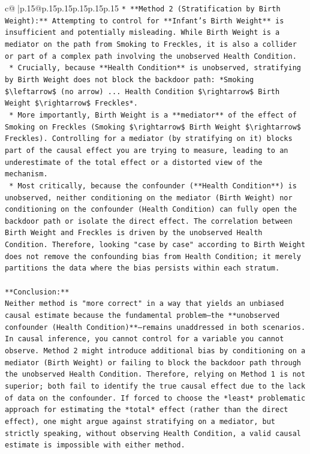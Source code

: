 \documentclass{article}
\begin{document}
{\begin{supertabular}{c@{$\;$}|p{.15\linewidth}@{}p{.15\linewidth}p{.15\linewidth}p{.15\linewidth}p{.15\linewidth}p{.15\linewidth}}
{{{\texttt{*   **Method 2 (Stratification by Birth Weight):** Attempting to control for **Infant's Birth Weight** is insufficient and potentially misleading. While Birth Weight is a mediator on the path from Smoking to Freckles, it is also a collider or part of a complex path involving the unobserved Health Condition.} \\
\texttt{    *   Crucially, because **Health Condition** is unobserved, stratifying by Birth Weight does not block the backdoor path: *Smoking \$\textbackslash{}leftarrow\$ (no arrow) ... Health Condition \$\textbackslash{}rightarrow\$ Birth Weight \$\textbackslash{}rightarrow\$ Freckles*.} \\
\texttt{    *   More importantly, Birth Weight is a **mediator** of the effect of Smoking on Freckles (Smoking \$\textbackslash{}rightarrow\$ Birth Weight \$\textbackslash{}rightarrow\$ Freckles). Controlling for a mediator (by stratifying on it) blocks part of the causal effect you are trying to measure, leading to an underestimate of the total effect or a distorted view of the mechanism.} \\
\texttt{    *   Most critically, because the confounder (**Health Condition**) is unobserved, neither conditioning on the mediator (Birth Weight) nor conditioning on the confounder (Health Condition) can fully open the backdoor path or isolate the direct effect. The correlation between Birth Weight and Freckles is driven by the unobserved Health Condition. Therefore, looking "case by case" according to Birth Weight does not remove the confounding bias from Health Condition; it merely partitions the data where the bias persists within each stratum.} \\
\\ 
\texttt{**Conclusion:**} \\
\texttt{Neither method is "more correct" in a way that yields an unbiased causal estimate because the fundamental problem—the **unobserved confounder (Health Condition)**—remains unaddressed in both scenarios. In causal inference, you cannot control for a variable you cannot observe. Method 2 might introduce additional bias by conditioning on a mediator (Birth Weight) or failing to block the backdoor path through the unobserved Health Condition. Therefore, relying on Method 1 is not superior; both fail to identify the true causal effect due to the lack of data on the confounder. If forced to choose the *least* problematic approach for estimating the *total* effect (rather than the direct effect), one might argue against stratifying on a mediator, but strictly speaking, without observing Health Condition, a valid causal estimate is impossible with either method.} \\
}}}
\end{supertabular}}
\end{document}
